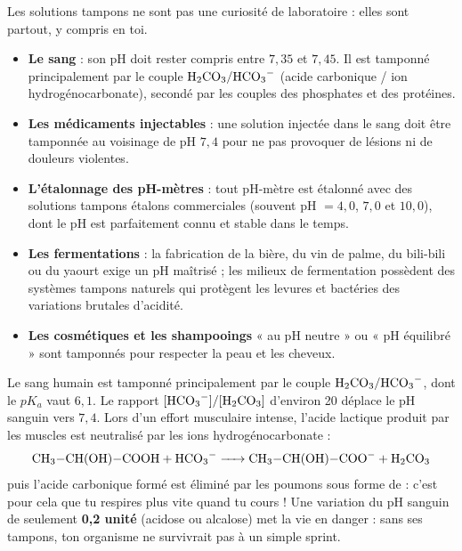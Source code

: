 \documentclass[11pt]{article}
\newcounter{popsec}
\newcounter{popsub}
\newcommand{\courssub}[1]{%
  \stepcounter{popsub}%
  \par\vspace{9pt}\noindent{\popxbold\fontsize{11.5}{13}\selectfont\color{popink}{\color{poporange}\thepopsec.\thepopsub}\hspace{6pt}#1}\par\nopagebreak\vspace{4pt}
}
\begin{document}
\courssub{Importance des solutions tampons}

Les solutions tampons ne sont pas une curiosité de laboratoire : elles sont partout, y compris en toi.

\begin{itemize}
\item \textbf{Le sang} : son pH doit rester compris entre $7{,}35$ et $7{,}45$. Il est tamponné principalement par le couple $\ce{H2CO3}/\ce{HCO3-}$ (acide carbonique / ion hydrogénocarbonate), secondé par les couples des phosphates et des protéines.
\item \textbf{Les médicaments injectables} : une solution injectée dans le sang doit être tamponnée au voisinage de pH $7{,}4$ pour ne pas provoquer de lésions ni de douleurs violentes.
\item \textbf{L'étalonnage des pH-mètres} : tout pH-mètre est étalonné avec des solutions tampons étalons commerciales (souvent pH $= 4{,}0$, $7{,}0$ et $10{,}0$), dont le pH est parfaitement connu et stable dans le temps.
\item \textbf{Les fermentations} : la fabrication de la bière, du vin de palme, du bili-bili ou du yaourt exige un pH maîtrisé ; les milieux de fermentation possèdent des systèmes tampons naturels qui protègent les levures et bactéries des variations brutales d'acidité.
\item \textbf{Les cosmétiques et les shampooings} « au pH neutre » ou « pH équilibré » sont tamponnés pour respecter la peau et les cheveux.
\end{itemize}

\begin{savaistu}
Le sang humain est tamponné principalement par le couple $\ce{H2CO3}/\ce{HCO3-}$, dont le $pK_a$ vaut $6{,}1$. Le rapport $[\ce{HCO3-}]/[\ce{H2CO3}]$ d'environ 20 déplace le pH sanguin vers $7{,}4$. Lors d'un effort musculaire intense, l'acide lactique produit par les muscles est neutralisé par les ions hydrogénocarbonate :
\[ \ce{CH3-CH(OH)-COOH + HCO3- -> CH3-CH(OH)-COO- + H2CO3} \]
puis l'acide carbonique formé est éliminé par les poumons sous forme de  : c'est pour cela que tu respires plus vite quand tu cours ! Une variation du pH sanguin de seulement \textbf{0,2 unité} (acidose ou alcalose) met la vie en danger : sans ses tampons, ton organisme ne survivrait pas à un simple sprint.
\end{savaistu}
\end{document}
